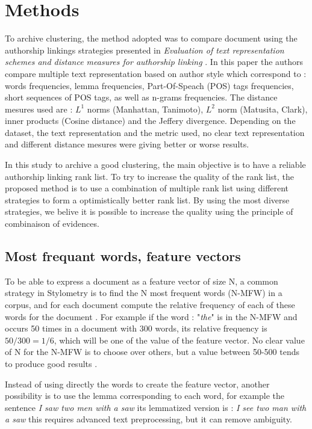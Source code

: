 \section{Methods}

To archive clustering, the method adopted was to compare document using the authorship linkings strategies presented in \textit{Evaluation of text representation schemes and distance measures for authorship linking} \cite{kocher_verification}.
In this paper the authors compare multiple text representation based on author style which correspond to : words frequencies, lemma frequencies, Part-Of-Speach (POS) tags frequencies, short sequences of POS tags, as well as n-grams frequencies.
The distance mesures used are : $L^1$ norms (Manhattan, Tanimoto), $L^2$ norm (Matusita, Clark), inner products (Cosine distance) and the Jeffery divergence.
Depending on the dataset, the text representation and the metric used, no clear text representation and different distance mesures were giving better or worse results.

In this study to archive a good clustering, the main objective is to have a reliable authorship linking rank list.
To try to increase the quality of the rank list, the proposed method is to use a combination of multiple rank list using different strategies to form a optimistically better rank list.
By using the most diverse strategies, we belive it is possible to increase the quality using the principle of combinaison of evidences.

\subsection{Most frequant words, feature vectors}

To be able to express a document as a feature vector of size N, a common strategy in Stylometry is to find the N most frequent words (N-MFW) in a corpus, and for each document compute the relative frequency of each of these words for the document \cite{savoy_stylo}.
For example if the word : "\textit{the}" is in the N-MFW and occurs 50 times in a document with 300 words, its relative frequency is $50/300 = 1/6$, which will be one of the value of the feature vector.
No clear value of N for the N-MFW is to choose over others, but a value between 50-500 tends to produce good results \cite{savoy_text_representation}.

Instead of using directly the words to create the feature vector, another possibility is to use the lemma corresponding to each word, for example the sentence \textit{I saw two men with a saw} its lemmatized version is : \textit{I see two man with a saw} this requires advanced text preprocessing, but it can remove ambiguity.

